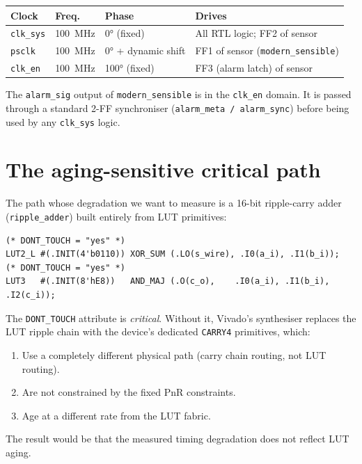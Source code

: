\documentclass[12pt, a4paper]{report}
\begin{document}
\begin{longtable}{@{}llll@{}}
  \toprule
  \textbf{Clock} & \textbf{Freq.} & \textbf{Phase} & \textbf{Drives} \\
  \midrule
  \endhead
  \texttt{clk\_sys} & 100~MHz & 0° (fixed) & All RTL logic; FF2 of sensor \\
  \texttt{psclk}    & 100~MHz & 0° + dynamic shift & FF1 of sensor (\texttt{modern\_sensible}) \\
  \texttt{clk\_en}  & 100~MHz & 100° (fixed) & FF3 (alarm latch) of sensor \\
  \bottomrule
\end{longtable}

The \texttt{alarm\_sig} output of \texttt{modern\_sensible} is in the
\texttt{clk\_en} domain. It is passed through a standard 2-FF synchroniser
(\texttt{alarm\_meta / alarm\_sync}) before being used by any
\texttt{clk\_sys} logic.

\section{The aging-sensitive critical path}

The path whose degradation we want to measure is a 16-bit ripple-carry adder
(\texttt{ripple\_adder}) built entirely from LUT primitives:

\begin{lstlisting}[style=verilog, caption={LUT full adder instantiation (lut\_full\_adder.sv)}]
(* DONT_TOUCH = "yes" *)
LUT2_L #(.INIT(4'b0110)) XOR_SUM (.LO(s_wire), .I0(a_i), .I1(b_i));
(* DONT_TOUCH = "yes" *)
LUT3   #(.INIT(8'hE8))   AND_MAJ (.O(c_o),    .I0(a_i), .I1(b_i), .I2(c_i));
\end{lstlisting}

The \texttt{DONT\_TOUCH} attribute is \emph{critical}. Without it, Vivado's
synthesiser replaces the LUT ripple chain with the device's dedicated
\texttt{CARRY4} primitives, which:
\begin{enumerate}
  \item Use a completely different physical path (carry chain routing, not LUT routing).
  \item Are not constrained by the fixed PnR constraints.
  \item Age at a different rate from the LUT fabric.
\end{enumerate}

The result would be that the measured timing degradation does not reflect LUT aging.
\end{document}
